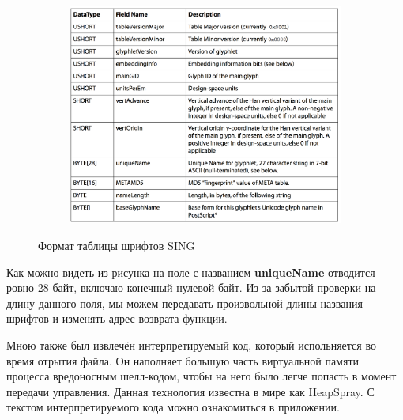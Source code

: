 \begin{figure}[ht]
	\centering
    \begin{subfigure}[b]{1\textwidth}
    \centering
        \includegraphics[scale=0.5]{1.pdf/pasted-image-15.png}
    \end{subfigure}
 
    \caption{Формат таблицы шрифтов SING}
    \label{fig_parsetree}
\end{figure}

Как можно видеть из рисунка на поле с названием \textbf{uniqueName} отводится ровно 28 байт, включаю конечный нулевой байт.
Из-за забытой проверки на длину данного поля, мы можем передавать произвольной длины названия шрифтов и изменять адрес возврата функции.

Мною также был извлечён интерпретируемый код, который испольняется во время отрытия файла.
Он наполняет большую часть виртуальной памяти процесса вредоносным шелл-кодом, чтобы на него было легче попасть в момент передачи управления.
Данная технология известна в мире как HeapSpray. \cite{heap_spray}
С текстом интерпретируемого кода можно ознакомиться в приложении.

